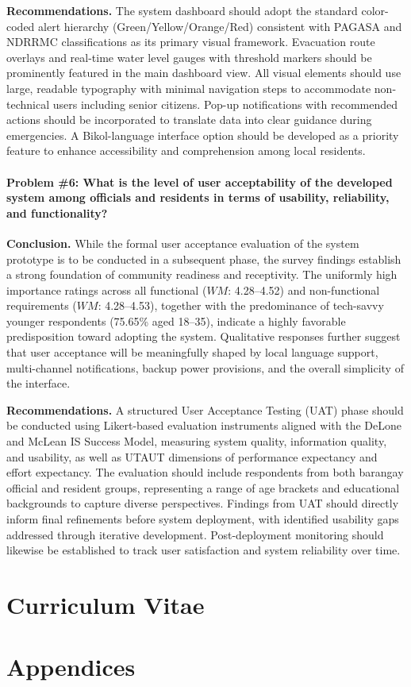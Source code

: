 \documentclass{research}
\begin{document}
\textbf{Recommendations.} The system dashboard should adopt the standard
color-coded alert hierarchy (Green/Yellow/Orange/Red) consistent with PAGASA and
NDRRMC classifications as its primary visual framework. Evacuation route overlays
and real-time water level gauges with threshold markers should be prominently
featured in the main dashboard view. All visual elements should use large, readable
typography with minimal navigation steps to accommodate non-technical users
including senior citizens. Pop-up notifications with recommended actions should be
incorporated to translate data into clear guidance during emergencies. A
Bikol-language interface option should be developed as a priority feature to enhance
accessibility and comprehension among local residents.

\subsubsection*{Problem \#6: What is the level of user acceptability of the developed system among officials and residents in terms of usability, reliability, and functionality?}

\textbf{Conclusion.} While the formal user acceptance evaluation of the system
prototype is to be conducted in a subsequent phase, the survey findings establish a
strong foundation of community readiness and receptivity. The uniformly high
importance ratings across all functional ($WM$: 4.28--4.52) and non-functional
requirements ($WM$: 4.28--4.53), together with the predominance of tech-savvy
younger respondents (75.65\% aged 18--35), indicate a highly favorable predisposition
toward adopting the system. Qualitative responses further suggest that user acceptance
will be meaningfully shaped by local language support, multi-channel notifications,
backup power provisions, and the overall simplicity of the interface.

\textbf{Recommendations.} A structured User Acceptance Testing (UAT) phase should
be conducted using Likert-based evaluation instruments aligned with the DeLone and
McLean IS Success Model, measuring system quality, information quality, and
usability, as well as UTAUT dimensions of performance expectancy and effort
expectancy. The evaluation should include respondents from both barangay official and
resident groups, representing a range of age brackets and educational backgrounds to
capture diverse perspectives. Findings from UAT should directly inform final
refinements before system deployment, with identified usability gaps addressed through
iterative development. Post-deployment monitoring should likewise be established to
track user satisfaction and system reliability over time.



\printbibliography

\clearpage

\chapter*{Curriculum Vitae}

\chapter*{Appendices}
\end{document}
